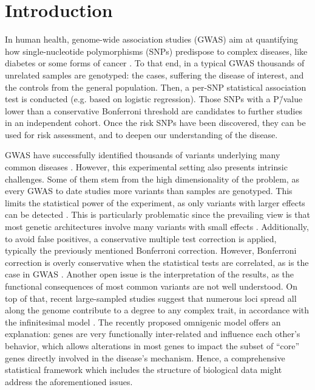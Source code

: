 \documentclass[draft,twocolumn, 11pt]{article}
\begin{document}
\section{Introduction}

In human health, genome-wide association studies (GWAS) aim at quantifying how single-nucleotide polymorphisms (SNPs) predispose to complex diseases, like diabetes or some forms of cancer \cite{bush_chapter_2012}. To that end, in a typical GWAS thousands of unrelated samples are genotyped: the cases, suffering the disease of interest, and the controls from the general population. Then, a per-SNP statistical association test is conducted (e.g. based on logistic regression). Those SNPs with a P\=/value lower than a conservative Bonferroni threshold are candidates to further studies in an independent cohort. Once the risk SNPs have been discovered, they can be used for risk assessment, and to deepen our understanding of the disease.

GWAS have successfully identified thousands of variants underlying many common diseases \cite{buniello_nhgri-ebi_2019}. However, this experimental setting also presents intrinsic challenges. Some of them stem from the high dimensionality of the problem, as every GWAS to date studies more variants than samples are genotyped. This limits the statistical power of the experiment, as only variants with larger effects can be detected \cite{visscher_10_2017}. This is particularly problematic since the prevailing view is that most genetic architectures involve many variants with small effects \cite{visscher_10_2017}. Additionally, to avoid false positives, a conservative multiple test correction is applied, typically the previously mentioned Bonferroni correction. However, Bonferroni correction is overly conservative when the statistical tests are correlated, as is the case in GWAS \cite{wang_statistical_2018}. Another open issue is the interpretation of the results, as the functional consequences of most common variants are not well understood. On top of that, recent large-sampled studies suggest that numerous loci spread all along the genome contribute to a degree to any complex trait, in accordance with the infinitesimal model \cite{barton_infinitesimal_2017}. The recently proposed omnigenic model \cite{boyle_expanded_2017} offers an explanation: genes are very functionally inter-related and influence each other's behavior, which allows alterations in most genes to impact the subset of ``core'' genes directly involved in the disease's mechanism. Hence, a comprehensive statistical framework which includes the structure of biological data might address the aforementioned issues.
\end{document}
